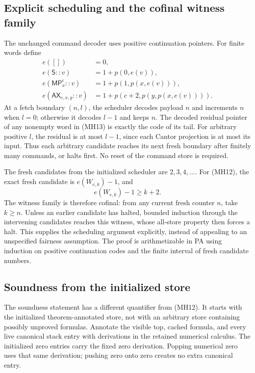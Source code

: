 \subsection{Explicit scheduling and the cofinal witness family}

The unchanged command decoder uses positive continuation pointers.
For finite words define
\[
 \begin{aligned}
 e([])&=0,\\
 e(\mathsf S::v)&=1+p(0,e(v)),\\
 e(\mathsf{MP}^{\epsilon}_x::v)&=1+p(1,p(x,e(v))),\\
 e(\mathsf{AX}_{c,x,y}::v)&=1+p(c+2,p(y,p(x,e(v)))).
 \end{aligned}
 \tag{MH13}
\]
At a fetch boundary $(n,l)$, the scheduler decodes payload $n$ and
increments $n$ when $l=0$; otherwise it decodes $l-1$ and keeps $n$.
The decoded residual pointer of any nonempty word in (MH13) is exactly
the code of its tail. For arbitrary positive $l$, the residual is at
most $l-1$, since each Cantor projection is at most its input. Thus each
arbitrary candidate reaches its next fresh boundary after finitely many
commands, or halts first. No reset of the command store is required.

The fresh candidates from the initialized scheduler are $2,3,4,\ldots$.
For (MH12), the exact fresh candidate is $e(W_{e,k})-1$, and
\[
             e(W_{e,k})-1\ge k+2.
 \tag{MH14}
\]
The witness family is therefore cofinal: from any current fresh counter
$n$, take $k\ge n$. Unless an earlier candidate has halted, bounded
induction through the intervening candidates reaches this witness, whose
all-store property then forces a halt. This supplies the scheduling
argument explicitly, instead of appealing to an unspecified fairness
assumption. The proof is arithmetizable in PA using induction on positive
continuation codes and the finite interval of fresh candidate numbers.

\subsection{Soundness from the initialized store}

The soundness statement has a different quantifier from (MH12).
It starts with the initialized theorem-annotated store, not with an
arbitrary store containing possibly unproved formulas. Annotate the
visible top, cached formula, and every live canonical stack entry with
derivations in the retained numerical calculus. The initialized zero
entries carry the fixed zero derivation. Popping numerical zero uses that
same derivation; pushing zero onto zero creates no extra canonical entry.

